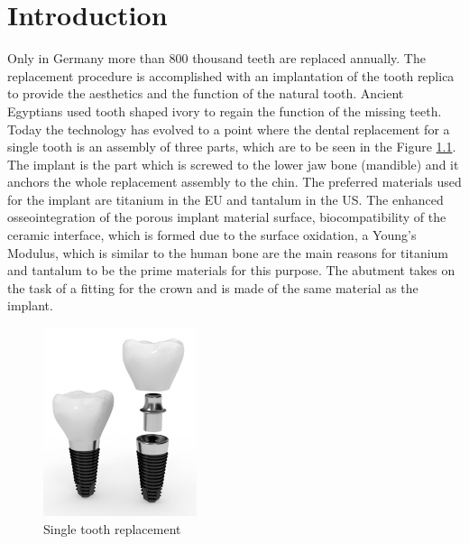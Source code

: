 \cleardoublepage
{}


\chapter{Introduction}
\label{sec:problemstellung}
 Only in Germany more than 800 thousand teeth are replaced annually\citep{hille}. The replacement procedure is accomplished with an implantation of the tooth replica to provide the aesthetics and the function of the natural tooth. Ancient Egyptians used tooth shaped ivory to regain the function of the missing teeth. Today the technology has evolved to a point where the dental replacement for a single tooth is an assembly of three parts, which  are to be seen in the Figure \ref{fig:implant}. The implant is the part which is screwed to the lower jaw bone (mandible) and it anchors the whole replacement assembly to the chin. The preferred materials used for the implant are titanium in the EU and tantalum in the US. The enhanced osseointegration of the porous implant material surface, biocompatibility of the ceramic interface, which is formed due to the surface oxidation, a Young's Modulus, which is similar to the human bone are the main reasons for titanium and tantalum to be the prime materials for this purpose. The abutment takes on the task of a fitting  for the crown and is made of the same material as the implant.
 
 \bigskip
 
  \begin{figure}[H]
 	\centering
 	\includegraphics[width=0.4\textwidth]{grafiken/implant.png}
 	\caption{Single tooth replacement}
 	\label{fig:implant}
 \end{figure} 

